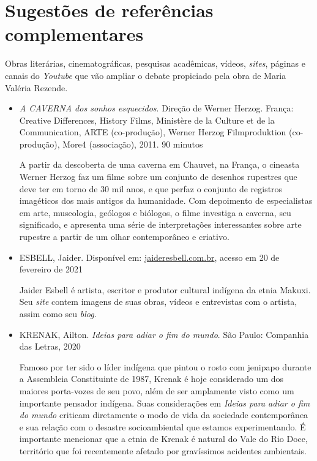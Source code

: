 \documentclass[12pt]{extarticle}
\begin{document}
\section{Sugestões de referências complementares}

Obras literárias, cinematográficas, pesquisas acadêmicas, vídeos,
\emph{sites}, páginas e canais do \emph{Youtube} que vão ampliar o
debate propiciado pela obra de Maria Valéria Rezende.

\begin{itemize}

\item    \emph{A CAVERNA dos sonhos esquecidos}. Direção de Werner Herzog.
    França: Creative Differences, History Films, Ministère de la Culture
    et de la Communication, ARTE (co-produção), Werner Herzog
    Filmproduktion (co-produção), More4 (associação), 2011. 90 minutos

    A partir da descoberta de uma caverna em Chauvet, na França, o
    cineasta Werner Herzog faz um filme sobre um conjunto de desenhos
    rupestres que deve ter em torno de 30 mil anos, e que perfaz o
    conjunto de registros imagéticos dos mais antigos da humanidade. Com
    depoimento de especialistas em arte, museologia, geólogos e
    biólogos, o filme investiga a caverna, seu significado, e apresenta
    uma série de interpretações interessantes sobre arte rupestre a
    partir de um olhar contemporâneo e criativo.

  \item
    ESBELL, Jaider. Disponível em:
    \href{http://www.jaideresbell.com.br/site/}{jaideresbell.com.br},
    acesso em 20 de fevereiro de 2021

    Jaider Esbell é artista, escritor e produtor cultural indígena da
    etnia Makuxi. Seu \emph{site} contem imagens de suas obras, vídeos e
    entrevistas com o artista, assim como seu \emph{blog}.

  \item
    KRENAK, Ailton. \emph{Ideias para adiar o fim do mundo}. São Paulo:
    Companhia das Letras, 2020

    Famoso por ter sido o líder indígena que pintou o rosto com jenipapo
    durante a Assembleia Constituinte de 1987, Krenak é hoje considerado
    um dos maiores porta-vozes de seu povo, além de ser amplamente visto
    como um importante pensador indígena. Suas considerações em
    \emph{Ideias para adiar o fim do mundo} criticam diretamente o modo
    de vida da sociedade contemporânea e sua relação com o desastre
    socioambiental que estamos experimentando. É importante mencionar
    que a etnia de Krenak é natural do Vale do Rio Doce, território que
    foi recentemente afetado por gravíssimos acidentes ambientais.


\end{itemize}
\end{document}
